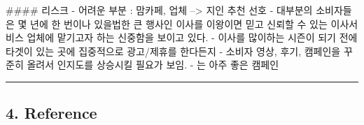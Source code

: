 \documentclass[11pt]{article}
\begin{document}
 \#\#\#\# 리스크 - 어려운 부분 : 맘카페, 업체 --\textgreater{} 지인 추천
선호 - 대부분의 소비자들은 몇 년에 한 번이나 있을법한 큰 행사인 이사를
이왕이면 믿고 신뢰할 수 있는 이사서비스 업체에 맡기고자 하는 신중함을
보이고 있다. - 이사를 많이하는 시즌이 되기 전에 타겟이 있는 곳에
집중적으로 광고/제휴를 한다든지 - 소비자 영상, 후기, 캠페인을 꾸준히
올려서 인지도를 상승시킬 필요가 보임. - 는 아주 좋은 캠페인

\begin{center}\rule{0.5\linewidth}{\linethickness}\end{center}

\hypertarget{reference}{%
\subsection{4. Reference}\label{reference}}
\end{document}
